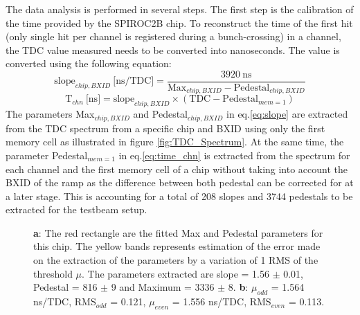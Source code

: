 \documentclass[twoside,a4paper,11pt]{article}
\begin{document}
The data analysis is performed in several steps. The first step is the calibration of the time provided by the SPIROC2B chip. To reconstruct the time of the first hit (only single hit per channel is registered during a bunch-crossing) in a channel, the TDC value measured needs to be converted into nanoseconds. The value is converted using the following equation:
\begin{equation} \label{eq:slope}
 \text{slope}_{chip, BXID} \: \text{[ns/TDC]} = \frac{3920 \: \text{ns}}{\text{Max}_{chip, BXID} - \text{Pedestal}_{chip, BXID}}
\end{equation}
\begin{equation} \label{eq:time_chn}
\text{T}_{chn} \: \text{[ns]} = \text{slope}_{chip, BXID} \times (\text{TDC} - \text{Pedestal}_{mem=1} )
\end{equation}
The parameters Max$_{chip, BXID}$ and Pedestal$_{chip, BXID}$ in eq.\ref{eq:slope} are extracted from the TDC spectrum from a specific chip and BXID using only the first memory cell as illustrated in figure \ref{fig:TDC_Spectrum}. At the same time, the parameter Pedestal$_{mem=1}$ in eq.\ref{eq:time_chn} is extracted from the spectrum for each channel and the first memory cell of a chip without taking into account the BXID of the ramp as the difference between both pedestal can be corrected for at a later stage. This is accounting for a total of 208 slopes and 3744 pedestals to be extracted for the testbeam setup.
\begin{figure}[htbp]
	\hfill
	\caption[]{\textbf{a}: The red rectangle are the fitted Max and Pedestal parameters for this chip. The yellow bands represents estimation of the error made on the extraction of the parameters by a variation of 1 RMS of the threshold $\mu$. The parameters extracted are slope = 1.56 $\pm$ 0.01, Pedestal = 816 $\pm$ 9 and Maximum = 3336 $\pm$ 8. \textbf{b}: $\mu_{odd}$ = 1.564 ns/TDC, RMS$_{odd}$ = 0.121, $\mu_{even}$ = 1.556 ns/TDC, RMS$_{even}$ = 0.113.}
\end{figure}
\end{document}
